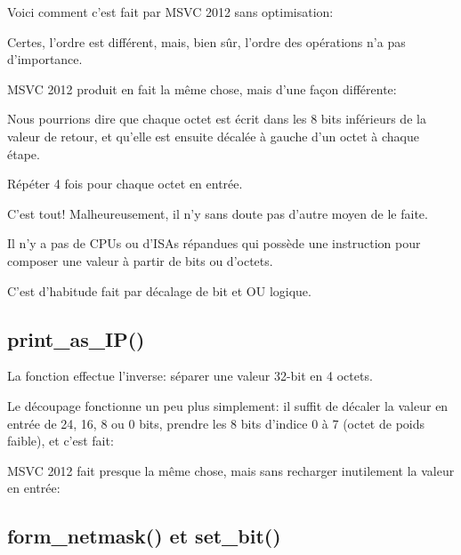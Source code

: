 Voici comment c'est fait par MSVC 2012 sans optimisation:



Certes, l'ordre est différent, mais, bien sûr, l'ordre des opérations n'a pas d'importance.

MSVC 2012 \Optimizing produit en fait la même chose, mais d'une façon différente:



Nous pourrions dire que chaque octet est écrit dans les 8 bits inférieurs de la valeur
de retour, et qu'elle est ensuite décalée à gauche d'un octet à chaque étape.

Répéter 4 fois pour chaque octet en entrée.

\par
C'est tout! Malheureusement, il n'y sans doute pas d'autre moyen de le faite.

Il n'y a pas de \ac{CPU}s ou d'\ac{ISA}s répandues qui possède une instruction pour
composer une valeur à partir de bits ou d'octets.

C'est d'habitude fait par décalage de bit et OU logique.

\subsection{print\_as\_IP()}

La fonction  effectue l'inverse: séparer une valeur 32-bit en
4 octets.

Le découpage fonctionne un peu plus simplement: il suffit de décaler la valeur en
entrée de 24, 16, 8 ou 0 bits, prendre les 8 bits d'indice 0 à 7 (octet de poids
faible), et c'est fait:



MSVC 2012 \Optimizing fait presque la même chose, mais sans recharger inutilement
la valeur en entrée:



\subsection{form\_netmask() et set\_bit()}

